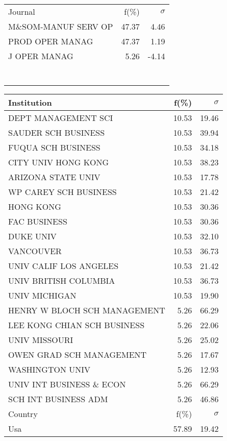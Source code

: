 \documentclass[a4paper,11pt]{report}
\begin{document}
\begin{landscape}
\begin{table}[!ht]
{\begin{tabular}{|l r  r|}
 &  & \\
\hline
\hline
Journal & f(\%) & $\sigma$\\
\hline
M\&SOM-MANUF SERV OP & 47.37 & 4.46\\
PROD OPER MANAG & 47.37 & 1.19\\
J OPER MANAG & 5.26 & -4.14\\
 &  & \\
 &  & \\
 &  & \\
 &  & \\
 &  & \\
 &  & \\
 &  & \\
\hline
\end{tabular}
}
{\scriptsize\begin{tabular}{|l r r|}
\hline
Institution & f(\%) & $\sigma$\\
\hline
DEPT MANAGEMENT SCI & 10.53 & 19.46\\
SAUDER SCH BUSINESS & 10.53 & 39.94\\
FUQUA SCH BUSINESS & 10.53 & 34.18\\
CITY UNIV HONG KONG & 10.53 & 38.23\\
ARIZONA STATE UNIV & 10.53 & 17.78\\
WP CAREY SCH BUSINESS & 10.53 & 21.42\\
HONG KONG & 10.53 & 30.36\\
FAC BUSINESS & 10.53 & 30.36\\
DUKE UNIV & 10.53 & 32.10\\
VANCOUVER & 10.53 & 36.73\\
UNIV CALIF LOS ANGELES & 10.53 & 21.42\\
UNIV BRITISH COLUMBIA & 10.53 & 36.73\\
UNIV MICHIGAN & 10.53 & 19.90\\
HENRY W BLOCH SCH MANAGEMENT & 5.26 & 66.29\\
LEE KONG CHIAN SCH BUSINESS & 5.26 & 22.06\\
UNIV MISSOURI & 5.26 & 25.02\\
OWEN GRAD SCH MANAGEMENT & 5.26 & 17.67\\
WASHINGTON UNIV & 5.26 & 12.93\\
UNIV INT BUSINESS \& ECON & 5.26 & 66.29\\
SCH INT BUSINESS ADM & 5.26 & 46.86\\
\hline
\hline
Country & f(\%) & $\sigma$\\
\hline
Usa & 57.89 & 19.42\\

\end{tabular}}
\end{table}
\end{landscape}
\end{document}
